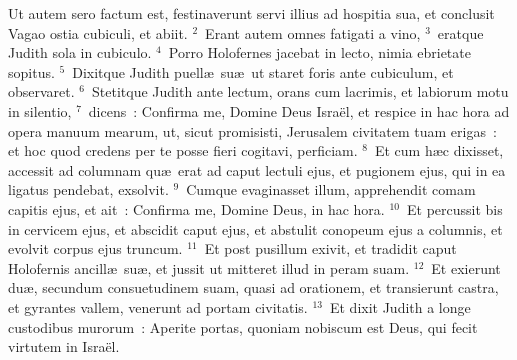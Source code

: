 \lettrine[lines=3,image=true,loversize=0.05,lraise=-0.03]{U}{}t autem sero factum est, festinaverunt servi illius ad hospitia sua, et conclusit Vagao ostia cubiculi, et abiit.
${}^{2}$~Erant autem omnes fatigati a vino,
${}^{3}$~eratque Judith sola in cubiculo.
${}^{4}$~Porro Holofernes jacebat in lecto, nimia ebrietate sopitus.
${}^{5}$~Dixitque Judith puell\ae\ su\ae\ ut staret foris ante cubiculum, et observaret.
${}^{6}$~Stetitque Judith ante lectum, orans cum lacrimis, et labiorum motu in silentio,
${}^{7}$~dicens~: Confirma me, Domine Deus Isra\"el, et respice in hac hora ad opera manuum mearum, ut, sicut promisisti, Jerusalem civitatem tuam erigas~: et hoc quod credens per te posse fieri cogitavi, perficiam.
${}^{8}$~Et cum h\ae c dixisset, accessit ad columnam qu\ae\ erat ad caput lectuli ejus, et pugionem ejus, qui in ea ligatus pendebat, exsolvit.
${}^{9}$~Cumque evaginasset illum, apprehendit comam capitis ejus, et ait~: Confirma me, Domine Deus, in hac hora.
${}^{10}$~Et percussit bis in cervicem ejus, et abscidit caput ejus, et abstulit conopeum ejus a columnis, et evolvit corpus ejus truncum.
${}^{11}$~Et post pusillum exivit, et tradidit caput Holofernis ancill\ae\ su\ae , et jussit ut mitteret illud in peram suam.
${}^{12}$~Et exierunt du\ae , secundum consuetudinem suam, quasi ad orationem, et transierunt castra, et gyrantes vallem, venerunt ad portam civitatis.
${}^{13}$~Et dixit Judith a longe custodibus murorum~: Aperite portas, quoniam nobiscum est Deus, qui fecit virtutem in Isra\"el.


